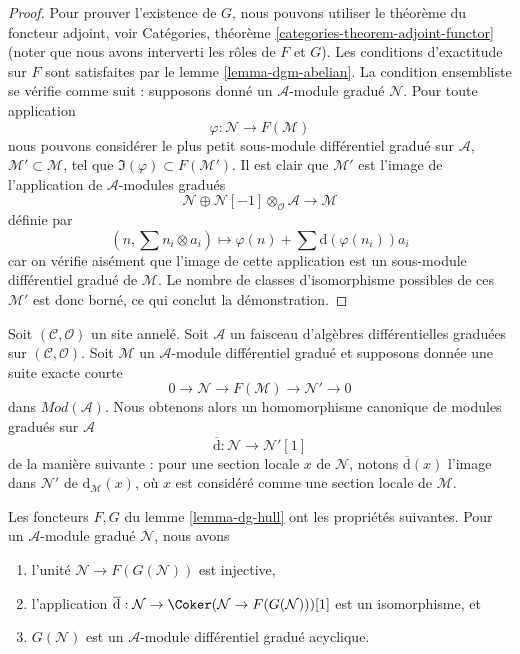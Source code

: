 \begin{proof}
Pour prouver l'existence de $G$, nous pouvons utiliser le théorème du foncteur
adjoint, voir Catégories, théorème \ref{categories-theorem-adjoint-functor} (noter que
nous avons interverti les rôles de $F$ et $G$). Les conditions d'exactitude sur
$F$ sont satisfaites par le lemme \ref{lemma-dgm-abelian}. La condition
ensembliste se vérifie comme suit : supposons donné un $\mathcal{A}$-module gradué
$\mathcal{N}$. Pour toute application
$$
\varphi : \mathcal{N} \longrightarrow F(\mathcal{M})
$$ nous
pouvons considérer le plus petit sous-module différentiel gradué sur $\mathcal{A}$,
$\mathcal{M}' \subset \mathcal{M}$, tel
que $\Im(\varphi) \subset F(\mathcal{M}')$.
Il est clair que $\mathcal{M}'$ est l'image de l'application
de $\mathcal{A}$-modules gradués
$$
\mathcal{N} \oplus
\mathcal{N}[-1] \otimes_\mathcal{O} \mathcal{A}
\longrightarrow
\mathcal{M}
$$ définie
par
$$ (n,
\sum n_i \otimes a_i) \longmapsto
\varphi(n) + \sum \text{d}(\varphi(n_i)) a_i
$$ car on vérifie
aisément que l'image de cette application est un sous-module différentiel
gradué de $\mathcal{M}$. Le nombre
de classes d'isomorphisme possibles de ces $\mathcal{M}'$ est donc borné, ce
qui conclut la démonstration.
\end{proof}

\noindent
Soit $(\mathcal{C}, \mathcal{O})$ un site annelé. Soit
$\mathcal{A}$ un faisceau d'algèbres différentielles graduées sur
$(\mathcal{C}, \mathcal{O})$. Soit $\mathcal{M}$ un
$\mathcal{A}$-module différentiel gradué et supposons donnée une suite exacte courte
$$ 0
\to \mathcal{N} \to F(\mathcal{M}) \to \mathcal{N}' \to 0
$$ dans
$\textit{Mod}(\mathcal{A})$. Nous obtenons alors un homomorphisme canonique
de modules gradués sur $\mathcal{A}$
$$
\overline{\text{d}} : \mathcal{N} \to \mathcal{N}'[1]
$$ de la manière
suivante : pour une section locale $x$ de $\mathcal{N}$, notons
$\overline{\text{d}}(x)$ l'image dans $\mathcal{N}'$ de
$\text{d}_\mathcal{M}(x)$, où $x$ est considéré comme une section locale
de $\mathcal{M}$.

\begin{lemma}
\label{lemma-dg-hull-acyclic}
Les foncteurs $F, G$ du lemme \ref{lemma-dg-hull} ont les
propriétés suivantes. Pour un $\mathcal{A}$-module gradué
$\mathcal{N}$, nous avons
\begin{enumerate}
\item l'unité $\mathcal{N} \to F(G(\mathcal{N}))$ est injective,
\item l'application $\overline{\text{d}} : \mathcal{N} \to
\Coker(\mathcal{N} \to F(G(\mathcal{N})))[1]$ est un isomorphisme, et
\item $G(\mathcal{N})$ est un $\mathcal{A}$-module différentiel gradué acyclique.
\end{enumerate}
\end{lemma}


